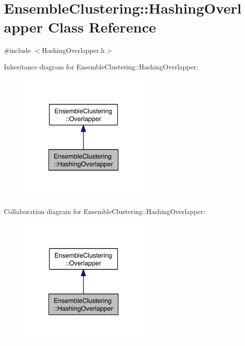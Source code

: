 \hypertarget{class_ensemble_clustering_1_1_hashing_overlapper}{\section{Ensemble\-Clustering\-:\-:Hashing\-Overlapper Class Reference}
\label{class_ensemble_clustering_1_1_hashing_overlapper}
}


{\ttfamily \#include $<$Hashing\-Overlapper.\-h$>$}



Inheritance diagram for Ensemble\-Clustering\-:\-:Hashing\-Overlapper\-:
\nopagebreak
\begin{figure}[H]
\begin{center}
\leavevmode
\includegraphics[width=186pt]{class_ensemble_clustering_1_1_hashing_overlapper__inherit__graph}
\end{center}
\end{figure}


Collaboration diagram for Ensemble\-Clustering\-:\-:Hashing\-Overlapper\-:
\nopagebreak
\begin{figure}[H]
\begin{center}
\leavevmode
\includegraphics[width=186pt]{class_ensemble_clustering_1_1_hashing_overlapper__coll__graph}
\end{center}
\end{figure}
